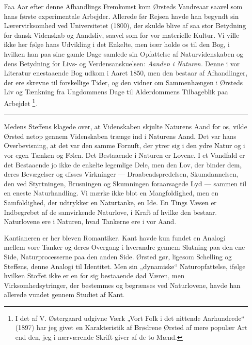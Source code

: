 \documentclass[12pt,a4paper,openany]{book}
\newcommand{\opage}[1]{\marginnote{\footnotesize\textit{[#1]}}}
\begin{document}
Faa Aar efter denne Afhandlings Fremkomst kom Ørsteds Vandreaar saavel som hans
første experimentale Arbejder. Allerede før Rejsen havde han begyndt sin
Lærervirksomhed ved Universitetet (1800), der skulde blive af saa stor
Betydning for dansk Videnskab og Aandsliv, saavel som for vor materielle
Kultur. Vi ville ikke her følge hans Udvikling i det Enkelte, men især holde os
til den Bog, i hvilken han
\setcounter{footnote}{0}%
\opage{51}paa sine gamle Dage samlede sin Opfattelse af Naturvidenskaben og
dens Betydning for Livs- og Verdensanskuelsen: \textit{Aanden i Naturen.} Denne
i vor Literatur enestaaende Bog udkom i Aaret 1850, men den bestaar af
Afhandlinger, der ere skrevne til forskellige Tider, og den vidner om
Sammenhængen i Ørsteds Liv og Tænkning fra Ungdommens Dage til Alderdommens
Tilbageblik paa Arbejdet%
\footnote[1]{I det af V. Østergaard udgivne Værk „Vort Folk i det nittende
Aarhundrede“ (1897) har jeg givet en Karakteristik af Brødrene Ørsted af mere
populær Art end den, jeg i nærværende Skrift giver af de to Mænd.}.

\begin{center}\rule{2cm}{0.4pt}\end{center}

Medens Steffens klagede over, at Videnskaben skjulte Naturens Aand for os,
vilde Ørsted netop gennem Videnskaben trænge ind i Naturens Aand. Det var hans
Overbevisning, at det var den samme Fornuft, der ytrer sig i den ydre Natur og
i vor egen Tænken og Følen. Det Bestaaende i Naturen er Lovene. I et Vandfald
er det Bestaaende jo ikke de enkelte legemlige Dele, men den Lov, der binder
dem, deres Bevægelser og disses Virkninger --- Draabeadspredelsen,
Skumdannelsen, den ved Styrtningen, Brusningen og Skumningen foraarsagede Lyd
--- sammen til en eneste Naturhandling. Vi mærke ikke blot en Mangfoldighed,
men en Samfoldighed, der udtrykker en Naturtanke, en Ide. En Tings Væsen er
Indbegrebet af de samvirkende Naturlove, i Kraft af hvilke den bestaar.
Naturlovene ere i Naturen, hvad Tankerne ere i vor Aand.

Kantianeren er her bleven Romantiker. Kant havde kun fundet en Analogi mellem
vore Tanker og deres Overgang i hverandre gennem Slutning paa den ene Side,
Naturprocesserne paa den anden Side. Ørsted gør, ligesom Schelling og Steffens,
denne Analogi til Identitet. Men sin „dynamiske“ Naturopfattelse, ifølge
hvilken Stoffet ikke er en for sig bestaaende død Væren, men
Virksomhedsytringer, der bestemmes og begrænses ved Naturlovene, havde han
allerede vundet gennem Studiet af Kant.
\end{document}
